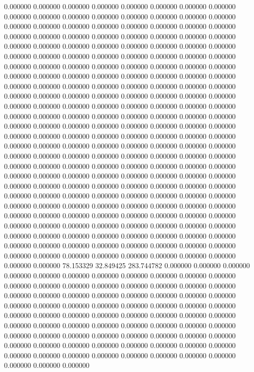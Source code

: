 0.000000 0.000000 0.000000
0.000000 0.000000 0.000000
0.000000 0.000000 0.000000
0.000000 0.000000 0.000000
0.000000 0.000000 0.000000
0.000000 0.000000 0.000000
0.000000 0.000000 0.000000
0.000000 0.000000 0.000000
0.000000 0.000000 0.000000
0.000000 0.000000 0.000000
0.000000 0.000000 0.000000
0.000000 0.000000 0.000000
0.000000 0.000000 0.000000
0.000000 0.000000 0.000000
0.000000 0.000000 0.000000
0.000000 0.000000 0.000000
0.000000 0.000000 0.000000
0.000000 0.000000 0.000000
0.000000 0.000000 0.000000
0.000000 0.000000 0.000000
0.000000 0.000000 0.000000
0.000000 0.000000 0.000000
0.000000 0.000000 0.000000
0.000000 0.000000 0.000000
0.000000 0.000000 0.000000
0.000000 0.000000 0.000000
0.000000 0.000000 0.000000
0.000000 0.000000 0.000000
0.000000 0.000000 0.000000
0.000000 0.000000 0.000000
0.000000 0.000000 0.000000
0.000000 0.000000 0.000000
0.000000 0.000000 0.000000
0.000000 0.000000 0.000000
0.000000 0.000000 0.000000
0.000000 0.000000 0.000000
0.000000 0.000000 0.000000
0.000000 0.000000 0.000000
0.000000 0.000000 0.000000
0.000000 0.000000 0.000000
0.000000 0.000000 0.000000
0.000000 0.000000 0.000000
0.000000 0.000000 0.000000
0.000000 0.000000 0.000000
0.000000 0.000000 0.000000
0.000000 0.000000 0.000000
0.000000 0.000000 0.000000
0.000000 0.000000 0.000000
0.000000 0.000000 0.000000
0.000000 0.000000 0.000000
0.000000 0.000000 0.000000
0.000000 0.000000 0.000000
0.000000 0.000000 0.000000
0.000000 0.000000 0.000000
0.000000 0.000000 0.000000
0.000000 0.000000 0.000000
0.000000 0.000000 0.000000
0.000000 0.000000 0.000000
0.000000 0.000000 0.000000
0.000000 0.000000 0.000000
0.000000 0.000000 0.000000
0.000000 0.000000 0.000000
0.000000 0.000000 0.000000
0.000000 0.000000 0.000000
0.000000 0.000000 0.000000
0.000000 0.000000 0.000000
0.000000 0.000000 0.000000
0.000000 0.000000 0.000000
0.000000 0.000000 0.000000
0.000000 0.000000 0.000000
78.153329 32.849425 283.744782
0.000000 0.000000 0.000000
0.000000 0.000000 0.000000
0.000000 0.000000 0.000000
0.000000 0.000000 0.000000
0.000000 0.000000 0.000000
0.000000 0.000000 0.000000
0.000000 0.000000 0.000000
0.000000 0.000000 0.000000
0.000000 0.000000 0.000000
0.000000 0.000000 0.000000
0.000000 0.000000 0.000000
0.000000 0.000000 0.000000
0.000000 0.000000 0.000000
0.000000 0.000000 0.000000
0.000000 0.000000 0.000000
0.000000 0.000000 0.000000
0.000000 0.000000 0.000000
0.000000 0.000000 0.000000
0.000000 0.000000 0.000000
0.000000 0.000000 0.000000
0.000000 0.000000 0.000000
0.000000 0.000000 0.000000
0.000000 0.000000 0.000000
0.000000 0.000000 0.000000
0.000000 0.000000 0.000000
0.000000 0.000000 0.000000
